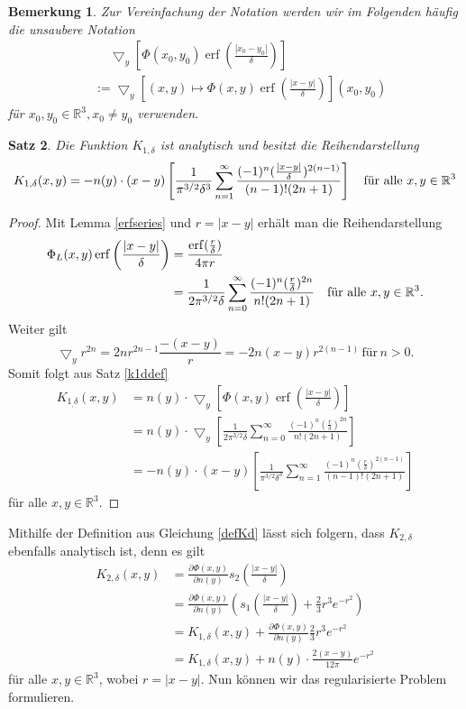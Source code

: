 \documentclass[12pt,a4paper]{scrartcl}
\newtheorem{Satz}{Satz}[section]
\newtheorem{Bemerkung}[Satz]{Bemerkung}
\numberwithin{equation}{section}
\newcommand{\R}{\mathbb{R}} %
\newcommand{\grad}{\bigtriangledown}
\newcommand{\erf}{\operatorname{erf}}
\newcommand{\fa}{\text{\quad für alle }}
\begin{document}
\begin{Bemerkung}
Zur Vereinfachung der Notation werden wir im Folgenden häufig die unsaubere Notation
\begin{align*}
&\quad \ \grad_y \left[\Phi (x_0,y_0) \erf \left(\frac{|x_0-y_0|}{\delta}\right) \right]\\
&:=\grad_y \left[(x,y) \mapsto \Phi (x,y) \erf \left(\frac{|x-y|}{\delta}\right) \right](x_0,y_0)
\end{align*}
für $x_0,y_0 \in \R^3, x_0\neq y_0$ verwenden.


\end{Bemerkung}
\begin{Satz} 
Die Funktion $K_{1,\delta}$ ist analytisch und besitzt die Reihendarstellung
\begin{equation}
K_{1,\delta}(x,y) =  -n(y) \cdot (x-y) \left[\frac{1}{\pi^{3/2} \delta^3} \sum_{n=1}^\infty \frac{(-1)^n(\frac{|x-y|}{\delta})^{2 (n-1)}}{(n-1)! (2n+1)} \right] \fa x,y \in \R^3
\end{equation}
\end{Satz}
\begin{proof}
Mit Lemma \ref{erfseries} und $r = |x-y|$ erhält man die Reihendarstellung
\begin{align*}
\Phi_L (x,y) \erf \left(\frac{|x-y|}{\delta}\right) & = \frac{\erf(\frac{r}{\delta})}{4 \pi r} \\
& =  \frac{1}{2 \pi^{3/2} \delta} \sum_{n=0}^\infty \frac{(-1)^n(\frac{r}{\delta})^{2 n}}{n! (2n+1)} \fa x,y \in \R^3.
\end{align*} 
Weiter gilt 
\[ 
\grad_y r^{2n} = 2n r^{2n-1} \frac{-(x-y)}{r}= -2n(x-y) r^{2(n-1)} \mathrm{\, für \,}n>0.
\] 
Somit folgt aus Satz \ref{k1ddef}
\begin{align*}
K_{1_,\delta}(x,y) &= n(y) \cdot \grad_y \left[ \Phi (x,y) \erf \left(\frac{|x-y|}{\delta}\right) \right] \\
&=n(y) \cdot  \grad_y \left[\frac{1}{2 \pi^{3/2} \delta} \sum_{n=0}^\infty \frac{(-1)^n(\frac{r}{\delta})^{2 n}}{n! (2n+1)} \right] \\
&=-n(y) \cdot(x-y) \left[\frac{1}{\pi^{3/2} \delta^3} \sum_{n=1}^\infty \frac{(-1)^n(\frac{r}{\delta})^{2 (n-1)}}{(n-1)! (2n+1)} \right]
\end{align*}
für alle $x,y \in \R^3$.

\end{proof}
Mithilfe der Definition aus Gleichung \eqref{defKd} lässt sich folgern, dass $K_{2,\delta}$ ebenfalls analytisch ist, denn es gilt 
\begin{align*}
K_{2,\delta}(x,y) &= \frac{\partial \Phi(x,y)}{\partial n (y)} s_2 \left(\frac{|x-y|}{\delta}\right) \\
  &= \frac{\partial \Phi(x,y)}{\partial n (y)} \left(s_1 \left(\frac{|x-y|}{\delta}\right) + \frac{2}{3}r^3 e^{-r^2} \right)\\
  &= K_{1,\delta}(x,y)  + \frac{\partial \Phi(x,y)}{\partial n (y)}\frac{2}{3}r^3 e^{-r^2} \\
  &=  K_{1,\delta}(x,y) + n(y) \cdot \frac{2(x-y)}{12\pi}e^{-r^2}
\end{align*}
für alle $x,y \in \R^3$, wobei $r=|x-y|$.
Nun können wir das regularisierte Problem formulieren.
\end{document}
